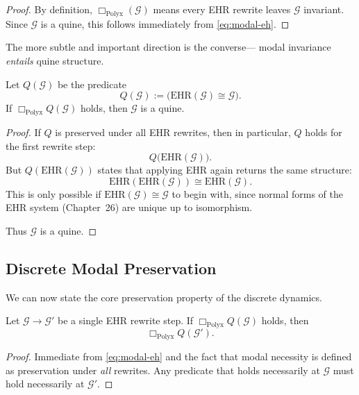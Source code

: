 \begin{proof}
By definition, $\Box_{\mathrm{Polyx}}(\mathcal{G})$
means every EHR rewrite leaves $\mathcal{G}$ invariant.
Since $\mathcal{G}$ is a quine, this follows immediately
from \eqref{eq:modal-eh}.
\end{proof}

The more subtle and important direction is the converse—
modal invariance \emph{entails} quine structure.

\begin{lemma}
\label{lem:modal-implies-quine}
Let $Q(\mathcal{G})$ be the predicate
\[
Q(\mathcal{G}) := \bigl(\mathrm{EHR}(\mathcal{G}) \cong \mathcal{G}\bigr).
\]
If $\Box_{\mathrm{Polyx}} Q(\mathcal{G})$ holds, then
$\mathcal{G}$ is a quine.
\end{lemma}

\begin{proof}
If $Q$ is preserved under all EHR rewrites, then in particular,
$Q$ holds for the first rewrite step:
\[
Q\bigl(\mathrm{EHR}(\mathcal{G})\bigr).
\]
But $Q(\mathrm{EHR}(\mathcal{G}))$ states that applying EHR again
returns the same structure:
\[
\mathrm{EHR}(\mathrm{EHR}(\mathcal{G})) \cong \mathrm{EHR}(\mathcal{G}).
\]
This is only possible if $\mathrm{EHR}(\mathcal{G}) \cong \mathcal{G}$  
to begin with, since normal forms of the EHR system (Chapter~26)
are unique up to isomorphism.

Thus $\mathcal{G}$ is a quine.
\end{proof}

\subsection{Discrete Modal Preservation}

We can now state the core preservation property of the discrete dynamics.

\begin{theorem}
\label{thm:modal-preservation-discrete}
Let $\mathcal{G}\to\mathcal{G}'$ be a single EHR rewrite step.
If $\Box_{\mathrm{Polyx}}Q(\mathcal{G})$ holds, then
\[
\Box_{\mathrm{Polyx}}Q(\mathcal{G}').
\]
\end{theorem}

\begin{proof}
Immediate from \eqref{eq:modal-eh} and the fact that 
modal necessity is defined as preservation under \emph{all} rewrites.
Any predicate that holds necessarily at $\mathcal{G}$
must hold necessarily at $\mathcal{G}'$.
\end{proof}

